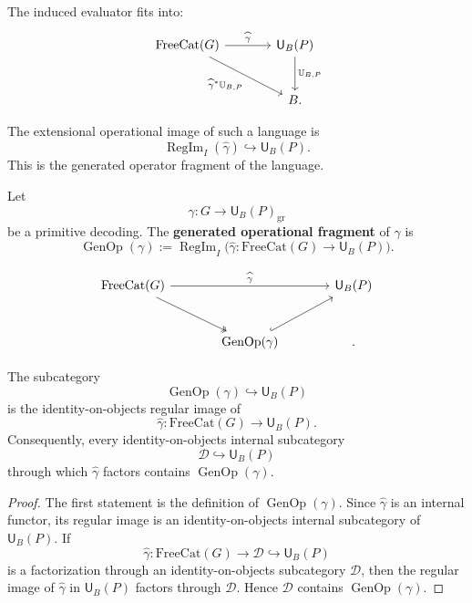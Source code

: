 The induced evaluator fits into:
\[
\begin{tikzcd}[column sep=large,row sep=large]
\mathrm{FreeCat}(G)
\ar[r,"\widehat{\gamma}"]
\ar[dr,swap,"\widehat{\gamma}^{\ast}\mathbb U_{B,P}"]
&
\mathsf U_B(P)
\ar[d,"\mathbb U_{B,P}"]
\\
&
B .
\end{tikzcd}
\]

The extensional operational image of such a language is
\[
        \operatorname{RegIm}_I(\widehat{\gamma})
        \hookrightarrow
        \mathsf U_B(P).
\]
This is the generated operator fragment of the language.

\begin{definition}
Let
\[
        \gamma:G\to\mathsf U_B(P)_{\mathrm{gr}}
\]
be a primitive decoding.  The \textbf{generated operational fragment} of \(\gamma\) is
\[
        \operatorname{GenOp}(\gamma)
        :=
        \operatorname{RegIm}_I
        \bigl(
            \widehat{\gamma}:\mathrm{FreeCat}(G)\to\mathsf U_B(P)
        \bigr).
\]
\end{definition}

\[
\begin{tikzcd}[column sep=large,row sep=large]
\mathrm{FreeCat}(G)
\ar[rr,"\widehat{\gamma}"]
\ar[dr,swap,two heads]
&
&
\mathsf U_B(P)
\\
&
\operatorname{GenOp}(\gamma)
\ar[ur,swap,hook]
&
.
\end{tikzcd}
\]

\begin{proposition}
\label{prop:minimality-generated-operational-fragment}
The subcategory
\[
        \operatorname{GenOp}(\gamma)\hookrightarrow \mathsf U_B(P)
\]
is the identity-on-objects regular image of
\[
        \widehat{\gamma}:\mathrm{FreeCat}(G)\to\mathsf U_B(P).
\]
Consequently, every identity-on-objects internal subcategory
\[
        \mathcal D\hookrightarrow \mathsf U_B(P)
\]
through which \(\widehat{\gamma}\) factors contains \(\operatorname{GenOp}(\gamma)\).
\end{proposition}

\begin{proof}
The first statement is the definition of \(\operatorname{GenOp}(\gamma)\).  Since
\(\widehat{\gamma}\) is an internal functor, its regular image is an identity-on-objects internal
subcategory of \(\mathsf U_B(P)\).  If
\[
        \widehat{\gamma}:\mathrm{FreeCat}(G)\to\mathcal D\hookrightarrow \mathsf U_B(P)
\]
is a factorization through an identity-on-objects subcategory \(\mathcal D\), then the regular
image of \(\widehat{\gamma}\) in \(\mathsf U_B(P)\) factors through \(\mathcal D\).  Hence
\(\mathcal D\) contains \(\operatorname{GenOp}(\gamma)\).
\end{proof}

